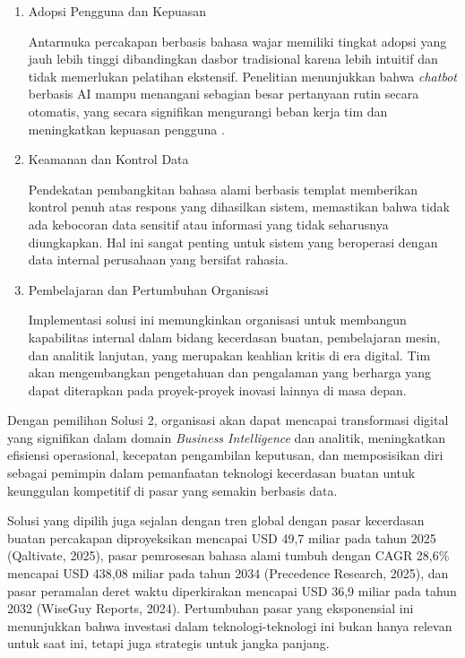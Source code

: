 \begin{enumerate}
    Implementasi \textit{chatbot} BI canggih dengan kemampuan kecerdasan buatan dan pembelajaran mesin memberikan keunggulan kompetitif bagi organisasi, meningkatkan kelincahan dan kecepatan pengambilan keputusan dibandingkan kompetitor yang masih menggunakan sistem konvensional. Organisasi yang mampu menganalisis data dan merespons tren pasar lebih cepat memiliki posisi yang lebih kuat dalam persaingan bisnis.
    
    \item Adopsi Pengguna dan Kepuasan
    
    Antarmuka percakapan berbasis bahasa wajar memiliki tingkat adopsi yang jauh lebih tinggi dibandingkan dasbor tradisional karena lebih intuitif dan tidak memerlukan pelatihan ekstensif. Penelitian menunjukkan bahwa \textit{chatbot} berbasis AI mampu menangani sebagian besar pertanyaan rutin secara otomatis, yang secara signifikan mengurangi beban kerja tim dan meningkatkan kepuasan pengguna \autocite{Adam2021Chatbots}.
    
    \item Keamanan dan Kontrol Data
    
    Pendekatan pembangkitan bahasa alami berbasis templat memberikan kontrol penuh atas respons yang dihasilkan sistem, memastikan bahwa tidak ada kebocoran data sensitif atau informasi yang tidak seharusnya diungkapkan. Hal ini sangat penting untuk sistem yang beroperasi dengan data internal perusahaan yang bersifat rahasia.
    
    \item Pembelajaran dan Pertumbuhan Organisasi
    
    Implementasi solusi ini memungkinkan organisasi untuk membangun kapabilitas internal dalam bidang kecerdasan buatan, pembelajaran mesin, dan analitik lanjutan, yang merupakan keahlian kritis di era digital. Tim akan mengembangkan pengetahuan dan pengalaman yang berharga yang dapat diterapkan pada proyek-proyek inovasi lainnya di masa depan.
\end{enumerate}

Dengan pemilihan Solusi 2, organisasi akan dapat mencapai transformasi digital yang signifikan dalam domain \textit{Business Intelligence} dan analitik, meningkatkan efisiensi operasional, kecepatan pengambilan keputusan, dan memposisikan diri sebagai pemimpin dalam pemanfaatan teknologi kecerdasan buatan untuk keunggulan kompetitif di pasar yang semakin berbasis data.

Solusi yang dipilih juga sejalan dengan tren global dengan pasar kecerdasan buatan percakapan diproyeksikan mencapai USD 49,7 miliar pada tahun 2025 (Qaltivate, 2025), pasar pemrosesan bahasa alami tumbuh dengan CAGR 28,6\% mencapai USD 438,08 miliar pada tahun 2034 (Precedence Research, 2025), dan pasar peramalan deret waktu diperkirakan mencapai USD 36,9 miliar pada tahun 2032 (WiseGuy Reports, 2024). Pertumbuhan pasar yang eksponensial ini menunjukkan bahwa investasi dalam teknologi-teknologi ini bukan hanya relevan untuk saat ini, tetapi juga strategis untuk jangka panjang.

